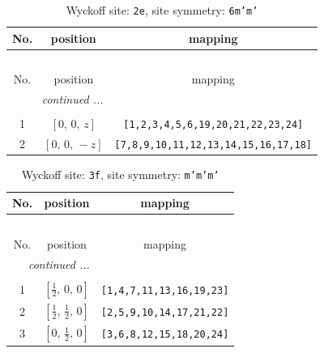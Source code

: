 \documentclass[fleqn,8pt]{jsarticle}
\begin{document}
\begin{longtable}{ccc}
\caption{Wyckoff site: {\tt 2e}, site symmetry: {\tt 6m'm'}}
 \\
 \hline \hline
No. & position & mapping \\ \hline \endfirsthead

\multicolumn{2}{l}{\tablename\ \thetable{}} \\
 \hline \hline
No. & position & mapping \\ \hline \endhead

 \hline \hline
\multicolumn{2}{r}{\footnotesize\it continued ...} \\ \endfoot

 \hline \hline
\multicolumn{2}{r}{} \\ \endlastfoot

1 & $\left[ 0,\, 0,\, z \right]$ & {\tt [1,2,3,4,5,6,19,20,21,22,23,24]} \\ \hline
2 & $\left[ 0,\, 0,\, - z \right]$ & {\tt [7,8,9,10,11,12,13,14,15,16,17,18]} \\
\end{longtable}
\renewcommand{\arraystretch}{1.2}
\begin{longtable}{ccc}
\caption{Wyckoff site: {\tt 3f}, site symmetry: {\tt m'm'm'}}
 \\
 \hline \hline
No. & position & mapping \\ \hline \endfirsthead

\multicolumn{2}{l}{\tablename\ \thetable{}} \\
 \hline \hline
No. & position & mapping \\ \hline \endhead

 \hline \hline
\multicolumn{2}{r}{\footnotesize\it continued ...} \\ \endfoot

 \hline \hline
\multicolumn{2}{r}{} \\ \endlastfoot

1 & $\left[ \frac{1}{2},\, 0,\, 0 \right]$ & {\tt [1,4,7,11,13,16,19,23]} \\ \hline
2 & $\left[ \frac{1}{2},\, \frac{1}{2},\, 0 \right]$ & {\tt [2,5,9,10,14,17,21,22]} \\ \hline
3 & $\left[ 0,\, \frac{1}{2},\, 0 \right]$ & {\tt [3,6,8,12,15,18,20,24]} \\
\end{longtable}
\renewcommand{\arraystretch}{1.2}
\end{document}
